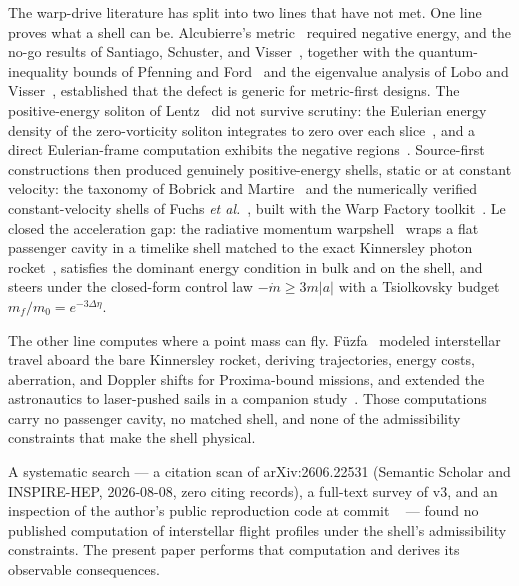 \documentclass[11pt]{article}
\begin{document}
The warp-drive literature has split into two lines that have not met. One
line proves what a shell can be. Alcubierre's metric~\cite{alcubierre}
required negative energy, and the no-go results of Santiago, Schuster, and
Visser~\cite{ssv}, together with the quantum-inequality bounds of Pfenning
and Ford~\cite{pfenning} and the eigenvalue analysis of Lobo and
Visser~\cite{lobo}, established that the defect is generic for
metric-first designs. The positive-energy soliton of Lentz~\cite{lentz}
did not survive scrutiny: the Eulerian energy density of the zero-vorticity
soliton integrates to zero over each slice~\cite{ssv}, and a direct
Eulerian-frame computation exhibits the negative regions~\cite{celmaster}.
Source-first constructions then produced genuinely positive-energy shells,
static or at constant velocity: the taxonomy of Bobrick and
Martire~\cite{bobrick} and the numerically verified constant-velocity
shells of Fuchs \emph{et al.}~\cite{fuchs}, built with the Warp Factory
toolkit~\cite{helmerich}. Le closed the acceleration gap: the radiative
momentum warpshell~\cite{le-steering} wraps a flat passenger cavity in a
timelike shell matched to the exact Kinnersley photon
rocket~\cite{kinnersley}, satisfies the dominant energy condition in bulk
and on the shell, and steers under the closed-form control law $-\dot m
\geq 3m|a|$ with a Tsiolkovsky budget $m_f/m_0 = e^{-3\Delta\eta}$.

The other line computes where a point mass can fly.
F\"uzfa~\cite{fuzfa2019} modeled interstellar travel aboard the bare
Kinnersley rocket, deriving trajectories, energy costs, aberration, and
Doppler shifts for Proxima-bound missions, and extended the astronautics
to laser-pushed sails in a companion study~\cite{fuzfa2020}. Those
computations carry no passenger cavity, no matched shell, and none of the
admissibility constraints that make the shell physical.

A systematic search --- a citation scan of arXiv:2606.22531 (Semantic
Scholar and INSPIRE-HEP, 2026-08-08, zero citing records), a full-text
survey of v3, and an inspection of the author's public reproduction code
at commit \NmWtCommit{}~\cite{worldtube} --- found no published computation
of interstellar flight profiles under the shell's admissibility
constraints. The present paper performs that computation and derives its
observable consequences.
\end{document}
